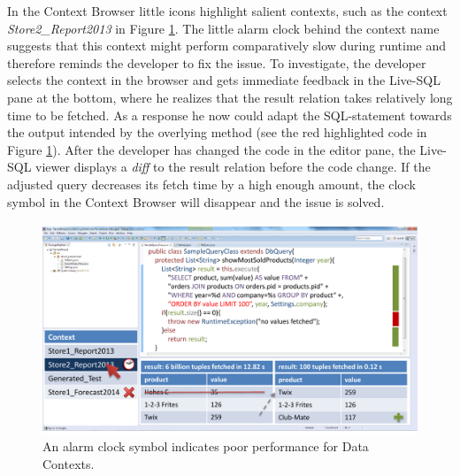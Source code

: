 In the Context Browser little icons highlight salient contexts, such as the context \emph{Store2\_Report2013} in Figure \ref{fig:final_prototype_slow}. The little alarm clock behind the context name suggests that this context might perform comparatively slow during runtime and therefore reminds the developer to fix the issue. To investigate, the developer selects the context in the browser and gets immediate feedback in the Live-SQL pane at the bottom, where he realizes that the result relation takes relatively long time to be fetched. As a response he now could adapt the SQL-statement towards the output intended by the overlying method (see the red highlighted code in Figure \ref{fig:final_prototype_slow}). After the developer has changed the code in the editor pane, the Live-SQL viewer displays a \emph{diff} to the result relation before the code change. If the adjusted query decreases its fetch time by a high enough amount, the clock symbol in the Context Browser will disappear and the issue is solved.\\
\begin{figure}
\begin{centering}
    \includegraphics[width=1.0\linewidth]{images/slow}
    \caption{An alarm clock symbol indicates poor performance for Data Contexts.}
    \label{fig:final_prototype_slow}
\end{centering}
\end{figure}
